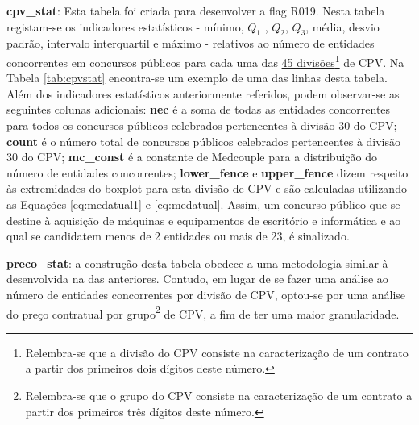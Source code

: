 \begin{my_itemize}
	
	\item \textbf{cpv\_stat}: Esta tabela foi criada para desenvolver a flag R019. Nesta tabela registam-se os indicadores estatísticos - mínimo, $Q_1$ , $Q_2$, $Q_3$, média, desvio padrão, intervalo interquartil e máximo - relativos ao número de entidades concorrentes em concursos públicos para cada uma das \hyperref[sec:cepeves]{45 divisões\footnote{Relembra-se que a divisão do CPV consiste na caracterização de um contrato a partir dos primeiros dois dígitos deste número.} de CPV}. Na Tabela \ref{tab:cpvstat} encontra-se um exemplo de uma das linhas desta tabela. Além dos indicadores estatísticos anteriormente referidos, podem observar-se as seguintes colunas adicionais: \textbf{nec} é a soma de todas as entidades concorrentes para todos os concursos públicos celebrados pertencentes à divisão 30 do CPV; \textbf{count} é o número total de concursos públicos celebrados pertencentes à divisão 30 do CPV; \textbf{mc\_const} é a constante de Medcouple para a distribuição do número de entidades concorrentes; \textbf{lower\_fence} e \textbf{upper\_fence} dizem respeito às extremidades do boxplot para esta divisão de CPV e são calculadas utilizando as Equações \ref{eq:medatual1} e \ref{eq:medatual}. Assim, um concurso público que se destine à aquisição de máquinas e equipamentos de escritório e informática e ao qual se candidatem menos de 2 entidades ou mais de 23, é sinalizado.
	
	
	\item \textbf{preco\_stat}: a construção desta tabela obedece a uma metodologia similar à desenvolvida na das  anteriores. Contudo, em lugar de se fazer uma análise ao número de entidades concorrentes por divisão de CPV, optou-se por  uma análise do preço contratual por \hyperref[sec:cepeves]{grupo\footnote{Relembra-se que o grupo do CPV consiste na caracterização de um contrato a partir dos primeiros três dígitos deste número.} de CPV}, a fim de ter uma maior granularidade. 
	
	
\end{my_itemize}




